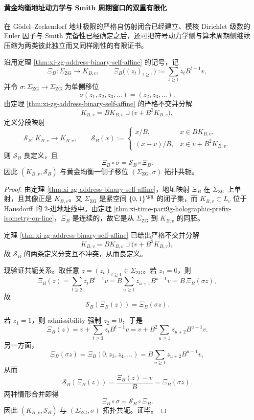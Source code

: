 \paragraph{黄金均衡地址动力学与 Smith 周期窗口的双重有限化}
在 Gödel--Zeckendorf 地址极限的严格自仿射闭合已经建立、模核 Dirichlet 级数的 Euler 因子与 Smith 完备性已经确定之后，还可把符号动力学侧与算术周期侧继续压缩为两类彼此独立而又同样刚性的有限证书。

\begin{conclusion}\label{con:xi-time-part62d-zg-address-golden-shift-conjugacy}
沿用定理 \ref{thm:xi-zg-address-binary-self-affine} 的记号，记
\[
\Xi_B:\Sigma_{\mathrm{ZG}}\longrightarrow K_{B,v},
\qquad
\Xi_B\bigl((z_t)_{t\ge 1}\bigr):=\sum_{t\ge 1}z_tB^{t-1}v,
\]
并令 \(\sigma:\Sigma_{\mathrm{ZG}}\to\Sigma_{\mathrm{ZG}}\) 为单侧移位
\[
\sigma(z_1,z_2,z_3,\dots)=(z_2,z_3,\dots).
\]
由定理 \ref{thm:xi-zg-address-binary-self-affine} 的严格不交并分解
\[
K_{B,v}=BK_{B,v}\sqcup\bigl(v+B^2K_{B,v}\bigr),
\]
定义分段映射
\[
\mathcal S_B:K_{B,v}\to K_{B,v},
\qquad
\mathcal S_B(x):=
\begin{cases}
x/B,& x\in BK_{B,v},\\[2pt]
(x-v)/B,& x\in v+B^2K_{B,v}.
\end{cases}
\]
则 \(\mathcal S_B\) 良定义，且
\[
\Xi_B\circ \sigma=\mathcal S_B\circ \Xi_B.
\]
因此 \((K_{B,v},\mathcal S_B)\) 与黄金均衡一侧子移位 \((\Sigma_{\mathrm{ZG}},\sigma)\) 拓扑共轭。
\end{conclusion}
\begin{proof}
由定理 \ref{thm:xi-zg-address-binary-self-affine}，地址映射 \(\Xi_B\) 在 \(\Sigma_{\mathrm{ZG}}\) 上单射，且其像正是 \(K_{B,v}\)。又 \(\Sigma_{\mathrm{ZG}}\) 是紧空间 \(\{0,1\}^{\NN}\) 的闭子集，而 \(K_{B,v}\subset L_v\) 位于 Hausdorff 的 \(2\)-进地址线中。由定理 \ref{thm:xi-time-part9g-holographic-prefix-isometry-on-line}，\(\Xi_B\) 是连续的，故它是从 \(\Sigma_{\mathrm{ZG}}\) 到 \(K_{B,v}\) 的同胚。

定理 \ref{thm:xi-zg-address-binary-self-affine} 已给出严格不交并分解
\[
K_{B,v}=BK_{B,v}\sqcup\bigl(v+B^2K_{B,v}\bigr),
\]
故 \(\mathcal S_B\) 的两条定义分支互不冲突，从而良定义。

现验证共轭关系。取任意 \(z=(z_t)_{t\ge 1}\in\Sigma_{\mathrm{ZG}}\)。若 \(z_1=0\)，则
\[
\Xi_B(z)
=
\sum_{t\ge 2}z_tB^{t-1}v
=
B\sum_{u\ge 1}z_{u+1}B^{u-1}v
=
B\,\Xi_B(\sigma z),
\]
故
\[
\mathcal S_B(\Xi_B(z))=\Xi_B(\sigma z).
\]

若 \(z_1=1\)，则 admissibility 强制 \(z_2=0\)，于是
\[
\Xi_B(z)
=
v+\sum_{t\ge 3}z_tB^{t-1}v
=
v+B^2\sum_{u\ge 1}z_{u+2}B^{u-1}v.
\]
另一方面，
\[
\Xi_B(\sigma z)
=
\Xi_B(0,z_3,z_4,\dots)
=
B\sum_{u\ge 1}z_{u+2}B^{u-1}v,
\]
从而
\[
\mathcal S_B(\Xi_B(z))
=
\frac{\Xi_B(z)-v}{B}
=
\Xi_B(\sigma z).
\]
两种情形合并即得
\[
\Xi_B\circ \sigma=\mathcal S_B\circ \Xi_B.
\]
因此 \((K_{B,v},\mathcal S_B)\) 与 \((\Sigma_{\mathrm{ZG}},\sigma)\) 拓扑共轭。证毕。
\end{proof}


